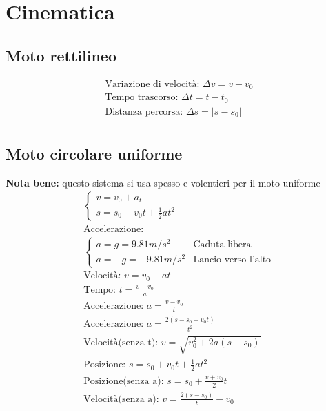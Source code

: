 \section{Cinematica}
\subsection{Moto rettilineo}
\begin{gather*}
\text{Variazione di velocità: } \Delta v = v - v_0 \\
\text{Tempo trascorso: } \Delta t = t - t_0 \\
\text{Distanza percorsa: } \Delta s = \left| s - s_0 \right| \\
\end{gather*}
\subsection{Moto circolare uniforme}
\textbf{Nota bene: } questo sistema si usa spesso e volentieri per il moto uniforme
\begin{gather*}
\begin{cases}
    v = v_0 + a_t \\
    s = s_0 + v_0 t + \frac{1}{2} a t^2
\end{cases}
\\
\text{Accelerazione:} \\
\begin{cases}
 a = g = 9.81 m/s^2 & \text{Caduta libera} \\
 a = -g = - 9.81m/s^2 & \text{Lancio verso l'alto}
\end{cases}
\\
\text{Velocità: } v = v_0 + a t \\
\text{Tempo: } t = \frac{v - v_0}{a} \\
\text{Accelerazione: } a = \frac{v - v_0}{t} \\
\text{Accelerazione: } a = \frac{2 (s - s_0 - v_0 t)}{t^2} \\
\text{Velocità(senza t): } v = \sqrt{v_0^2 + 2 a (s - s_0)} \\
\text{Posizione: } s = s_0 + v_0 t + \frac{1}{2} a t^2 \\
\text{Posizione(senza a): } s = s_0 + \frac{v + v_0}{2} t \\
\text{Velocità(senza a): } v = \frac{2 (s - s_0)}{t} - v_0
\end{gather*}

